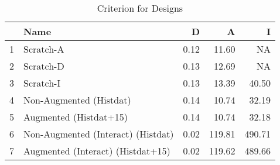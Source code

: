 \begin{table}[ht]
\centering
\caption{Criterion for Designs} 
\label{tab:criterion}
\begin{tabular}{rlrrr}
  \hline
 & Name & D & A & I \\ 
  \hline
1 & Scratch-A & 0.12 & 11.60 & NA \\ 
  2 & Scratch-D & 0.13 & 12.69 & NA \\ 
  3 & Scratch-I & 0.13 & 13.39 & 40.50 \\ 
  4 & Non-Augmented (Histdat) & 0.14 & 10.74 & 32.19 \\ 
  5 & Augmented (Histdat+15) & 0.14 & 10.74 & 32.18 \\ 
  6 & Non-Augmented (Interact) (Histdat) & 0.02 & 119.81 & 490.71 \\ 
  7 & Augmented (Interact) (Histdat+15) & 0.02 & 119.62 & 489.66 \\ 
   \hline
\end{tabular}
\end{table}
